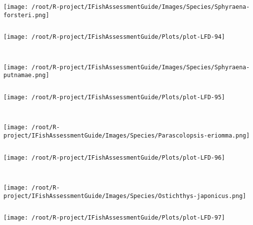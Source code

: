 \begin{knitrout}
\begin{kframe}
\begin{verbatim}
\end{verbatim}
\end{kframe}
\texttt{[image: /root/R-project/IFishAssessmentGuide/Images/Species/Sphyraena-forsteri.png]}
\begin{kframe}\begin{verbatim}
\end{verbatim}
\end{kframe}
\texttt{[image: /root/R-project/IFishAssessmentGuide/Plots/plot-LFD-94]} 
\begin{kframe}\begin{verbatim}
 
\end{verbatim}
\end{kframe}
\texttt{[image: /root/R-project/IFishAssessmentGuide/Images/Species/Sphyraena-putnamae.png]}
\begin{kframe}\begin{verbatim}
\end{verbatim}
\end{kframe}
\texttt{[image: /root/R-project/IFishAssessmentGuide/Plots/plot-LFD-95]} 
\begin{kframe}\begin{verbatim}
 
\end{verbatim}
\end{kframe}
\texttt{[image: /root/R-project/IFishAssessmentGuide/Images/Species/Parascolopsis-eriomma.png]}
\begin{kframe}\begin{verbatim}
\end{verbatim}
\end{kframe}
\texttt{[image: /root/R-project/IFishAssessmentGuide/Plots/plot-LFD-96]} 
\begin{kframe}\begin{verbatim}
 
\end{verbatim}
\end{kframe}
\texttt{[image: /root/R-project/IFishAssessmentGuide/Images/Species/Ostichthys-japonicus.png]}
\begin{kframe}\begin{verbatim}
\end{verbatim}
\end{kframe}
\texttt{[image: /root/R-project/IFishAssessmentGuide/Plots/plot-LFD-97]} 
\begin{kframe}\begin{verbatim}
 

\end{verbatim}
\end{kframe}
\end{knitrout}
